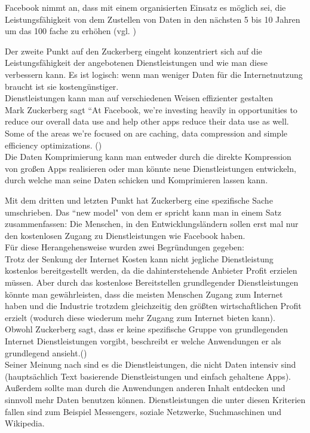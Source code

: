 \documentclass{article}
\begin{document}
Facebook nimmt an, dass mit einem organisierten Einsatz es möglich sei, die Leistungsfähigkeit von dem Zustellen von Daten in den   
nächsten 5 bis 10 Jahren um das 100 fache zu erhöhen  (vgl. \cite{HumanRight})\\

\medskip

Der zweite Punkt auf den Zuckerberg eingeht konzentriert sich auf die Leistungsfähigkeit der angebotenen Dienstleistungen und wie man    diese verbessern kann. Es ist logisch: wenn man weniger Daten für die Internetnutzung braucht ist sie kostengünstiger.\\

Dienstleistungen kann man auf verschiedenen Weisen effizienter gestalten\\

Mark Zuckerberg sagt ``At Facebook, we’re investing heavily in opportunities to reduce our overall data use and help  other apps     
reduce their data use as well. Some of the areas we’re focused on are caching, data compression and simple efficiency optimizations.
(\cite{HumanRight})\\

Die Daten Komprimierung kann man entweder durch die direkte Kompression von großen Apps realisieren oder man könnte neue Dienstleistungen entwickeln, durch welche man seine Daten schicken und Komprimieren lassen kann.\\

\medskip

Mit dem dritten und letzten Punkt hat Zuckerberg eine spezifische Sache umschrieben.
Das ``new model" von dem er spricht kann man in einem Satz zusammenfassen:
Die Menschen, in den Entwicklungsländern sollen erst mal nur den kostenlosen Zugang zu Dienstleistungen wie Facebook haben.\\
Für diese Herangehensweise wurden zwei Begründungen gegeben:\\

Trotz der Senkung der Internet Kosten kann nicht jegliche Dienstleistung kostenlos bereitgestellt werden, da die dahinterstehende Anbieter Profit erzielen müssen. 
Aber durch das kostenlose Bereitstellen grundlegender Dienstleistungen könnte man gewährleisten, dass die meisten Menschen Zugang zum Internet haben und die Industrie trotzdem gleichzeitig den größten wirtschaftlichen Profit erzielt (wodurch diese wiederum mehr Zugang zum Internet bieten kann).\\

Obwohl Zuckerberg sagt, dass er keine spezifische Gruppe von grundlegenden Internet Dienstleistungen vorgibt, beschreibt er welche Anwendungen er als grundlegend ansieht.(\cite{HumanRight})\\
Seiner Meinung nach sind es die Dienstleistungen, die nicht Daten intensiv sind (hauptsächlich Text basierende Dienstleistungen und einfach gehaltene Apps). 
Außerdem sollte man durch die Anwendungen anderen Inhalt entdecken und sinnvoll mehr Daten benutzen können.
Dienstleistungen die unter diesen Kriterien fallen sind zum Beispiel Messengers, soziale Netzwerke, Suchmaschinen und Wikipedia.\\
\end{document}
